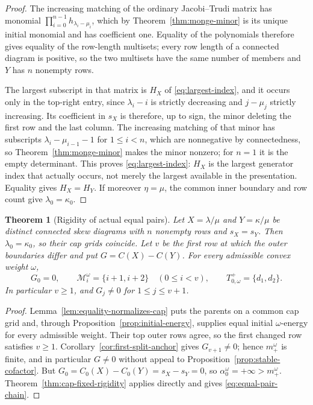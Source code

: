 \documentclass[11pt,a4paper]{amsart}
\numberwithin{equation}{section}
\theoremstyle{plain}
\newtheorem{theorem}{Theorem}[section]
\theoremstyle{definition}
\begin{document}
\begin{proof}
The increasing matching of the ordinary Jacobi--Trudi matrix has monomial \(\prod_{i=0}^{n-1}h_{\lambda_i-\mu_i}\), which by Theorem~\ref{thm:monge-minor} is its unique initial monomial and has coefficient one.  Equality of the polynomials therefore gives equality of the row-length multisets; every row length of a connected diagram is positive, so the two multisets have the same number of members and \(Y\) has \(n\) nonempty rows.

The largest subscript in that matrix is \(H_X\) of \eqref{eq:largest-index}, and it occurs only in the top-right entry, since \(\lambda_i-i\) is strictly decreasing and \(j-\mu_j\) strictly increasing.  Its coefficient in \(s_X\) is therefore, up to sign, the minor deleting the first row and the last column.  The increasing matching of that minor has subscripts \(\lambda_i-\mu_{i-1}-1\) for \(1\le i<n\), which are nonnegative by connectedness, so Theorem~\ref{thm:monge-minor} makes the minor nonzero; for \(n=1\) it is the empty determinant.  This proves \eqref{eq:largest-index}: \(H_X\) is the largest generator index that actually occurs, not merely the largest available in the presentation.  Equality gives \(H_X=H_Y\).  If moreover \(\eta=\mu\), the common inner boundary and row count give \(\lambda_0=\kappa_0\).
\end{proof}

\begin{theorem}[Rigidity of actual equal pairs]\label{thm:equal-pair-rigidity}
Let \(X=\lambda/\mu\) and \(Y=\kappa/\mu\) be distinct connected skew diagrams with \(n\) nonempty rows and \(s_X=s_Y\).  Then \(\lambda_0=\kappa_0\), so their cap grids coincide.  Let \(v\) be the first row at which the outer boundaries differ and put \(G=C(X)-C(Y)\).  For every admissible convex weight \(\omega\),
\begin{equation}\label{eq:equal-pair-chain}
G_0=0,
\qquad
\mathcal M_i^\omega=\{i+1,i+2\}
\quad(0\le i<v),
\qquad
T_{0,\omega}^+=\{d_1,d_2\}.
\end{equation}
In particular \(v\ge1\), and \(G_j\ne0\) for \(1\le j\le v+1\).
\end{theorem}

\begin{proof}
Lemma~\ref{lem:equality-normalizes-cap} puts the parents on a common cap grid and, through Proposition~\ref{prop:initial-energy}, supplies equal initial \(\omega\)-energy for every admissible weight.  Their top outer rows agree, so the first changed row satisfies \(v\ge1\).  Corollary~\ref{cor:first-split-anchor} gives \(G_{v+1}\ne0\); hence \(m_+^\omega\) is finite, and in particular \(G\ne0\) without appeal to Proposition~\ref{prop:stable-cofactor}.  But \(G_0=C_0(X)-C_0(Y)=s_X-s_Y=0\),
so \(\alpha_0^\omega=+\infty>m_+^\omega\).  Theorem~\ref{thm:cap-fixed-rigidity} applies directly and gives \eqref{eq:equal-pair-chain}.
\end{proof}
\end{document}
